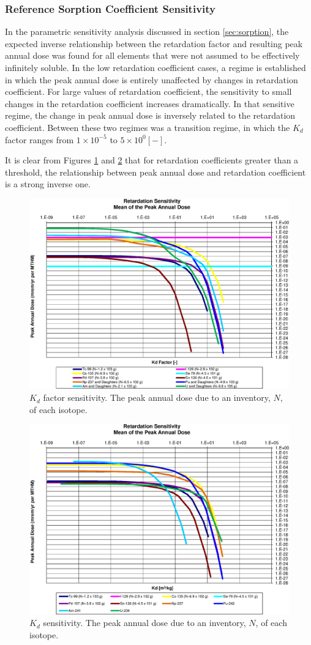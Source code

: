 
\subsubsection{Reference Sorption Coefficient Sensitivity}

In the parametric sensitivity analysis discussed in section \ref{sec:sorption}, 
the expected inverse relationship between the retardation factor and resulting 
peak annual dose was found for all elements that were not assumed to be 
effectively infinitely soluble. In the low retardation coefficient cases, a 
regime is established in which the peak annual dose is entirely unaffected by 
changes in retardation coefficient. For large values of retardation 
coefficient, the sensitivity to small changes in the retardation coefficient 
increases dramatically. In that sensitive regime, the change in peak annual 
dose is inversely related to the retardation coefficient. Between these two 
regimes was a transition regime, in which the $K_d$ factor ranges from 
$1\times10^{-5}$ to $5\times10^{0} [-]$.

It is clear from Figures \ref{fig:KdSumFactor} and \ref{fig:KdSum} that 
for retardation coefficients greater than a threshold, the 
relationship between peak annual dose and retardation coefficient is a strong 
inverse one. 

\begin{figure}[ht]
\centering
\includegraphics[width=0.7\linewidth]{./chapters/nuclide_sensitivity/clay/Sorption/Retardation_Summary_kdFactor.eps}
\caption{$K_d$ factor sensitivity.  The peak annual dose due to an inventory, 
$N$, of each isotope.}
\label{fig:KdSumFactor}
\end{figure}

\begin{figure}[ht]
\centering
\includegraphics[width=0.7\linewidth]{./chapters/nuclide_sensitivity/clay/Sorption/Retardation_Summary_kd.eps}
\caption{$K_d$ sensitivity.  The peak annual dose due to an inventory, 
$N$, of each isotope.}
\label{fig:KdSum}
\end{figure}

\clearpage
